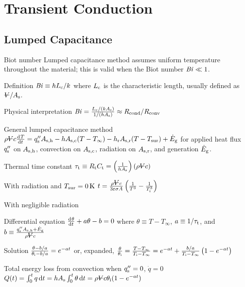 \documentclass{article}
\begin{document}
\section{Transient Conduction}

\subsection{Lumped Capacitance}
\begin{description*}
\item[Biot number] Lumped capacitance method assumes uniform temperature throughout the material;
  this is valid when the Biot number \(\mathord{\mathit{Bi}} \ll 1\).
  \begin{description*}
  \item[Definition]
    \(\mathord{\mathit{Bi}} \equiv hL_{\mathrm{c}}/k\) where \(L_{\mathrm{c}}\) is the characteristic length,
    usually defined as \(\volsym / A_\mrm{s}\).
  \item[Physical interpretation]
    \(\mathord{\mathit{Bi}} = \frac{L_{\mathrm{c}}/(kA_{\mathrm{s}})}{1/(hA_{\mathrm{s}})}
    \approx R_{\mathrm{cond}}/R_{\mathrm{conv}}\)
  \end{description*}
\item[General lumped capacitance method]
  \(\rho \volsym c \od{T}{t}
  = q''_\mrm{s}A_\mrm{s,h} - hA_\mrm{s,c}(T-T_\infty)
  - h_\mrm{r}A_\mrm{s,r}(T-T_\mrm{sur}) + \dot{E}_\mrm{g}\)
  for applied heat flux \(q''_{\mathrm{s}}\) on \(A_{\mathrm{s,h}}\), convection on \(A_{\mathrm{s,c}}\),
  radiation on \(A_{\mathrm{s,r}}\), and generation \(\dot{E}_{\mathrm{g}}\).
\item[Thermal time constant]
  \(\tau_\mrm{t} \equiv R_\mrm{t}C_\mrm{t}
  = \left(\frac{1}{hA_\mrm{s}}\right)(\rho\volsym{}c)\)
\item[With radiation and \(T_{\mathrm{sur}}=\SI{0}{\kelvin}\)]
  \(t = \frac{\rho\volsym{}c}{3\varepsilon\sigma A}\left(\frac{1}{T^3}-\frac{1}{T_\mrm{i}^3}\right)\)
\item[With negligible radiation]~
  \begin{description*}
  \item[Differential equation]
    \(\od{\theta}{t} + a\theta - b = 0\) where
    \(\theta \equiv T-T_\infty\),
    \(a \equiv 1/\tau_{\mathrm{t}}\), and
    \(b \equiv \frac{q''_\mrm{s}A_\mrm{s,h}+\dot{E}_\mrm{g}}{\rho\volsym{}c}\)
  \item[Solution]
    \(\frac{\theta-b/a}{\theta_{\mathrm{i}}-b/a} = e^{-at}\) or, expanded,
    \(\frac{\theta}{\theta_{\mathrm{i}}} = \frac{T-T_\infty}{T_{\mathrm{i}}-T_\infty}
    = e^{-at} + \frac{b/a}{T_{\mathrm{i}}-T_\infty}\left(1-e^{-at}\right)\)
  \item[Total energy loss from convection when $q''_{\mathrm{s}}=0$, $\dot{q}=0$]
    \(Q(t) = \int_0^t q \dif{t}
    = hA_\mrm{s}\int_0^t\theta\dif{t}
    = \rho\volsym{}c\theta_\mrm{i}(1-e^{-at})\)
  \end{description*}
\end{description*}
\end{document}
